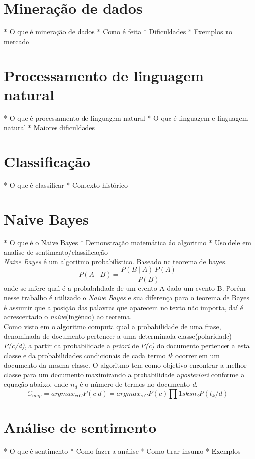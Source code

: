\section{Mineração de dados}\label{sec:mineracao_dados}
* O que é mineração de dados
* Como é feita
* Dificuldades
* Exemplos no mercado


\section{Processamento de linguagem natural}\label{sec:nlp}
* O que é processamento de linguagem natural
* O que é linguagem e linguagem natural
* Maiores dificuldades

\section{Classificação}\label{sec:classificacao}
* O que é classificar
* Contexto histórico




\section{Naive Bayes}\label{sec:naive_bayes}
* O que é o Naive Bayes
* Demonstração matemática do algoritmo
* Uso dele em analise de sentimento/classificação
\\ \emph{Naive Bayes} é um algoritmo probabilístico. Baseado no teorema de bayes. $$ P(A \mid B) = \frac{P(B \mid A) \, P(A)}{P(B)} $$ onde se infere qual é a probabilidade de um evento A dado um evento B. Porém nesse trabalho é utilizado o \emph{Naive Bayes} e sua diferença para o teorema de Bayes é assumir que a posição das palavras que aparecem no texto não importa, daí é acrescentado o \emph{naive}(ingênuo) ao teorema.
\\ Como visto em \cite{lucca2013implementaccao} o algoritmo computa qual a probabilidade de uma frase, denominada de documento pertencer a uma determinada classe(polaridade) \emph{P(c/d)}, a partir da probabilidade a \emph{priori} de \emph{P(c)} do documento pertencer a esta classe e da probabilidades condicionais de cada termo \emph{tk} ocorrer em um documento da mesma classe. O algoritmo tem como objetivo encontrar a melhor classe para um documento maximizando a probabilidade a\emph{posteriori} conforme a equação abaixo, onde $ n_{d} $ é o número de termos no documento \emph{d}. $$ C_{map}= argmax_{c \epsilon C}P(c|d)=argmax_{c \epsilon C}P(c)\prod 1sksn_{d}P(t_{k}/d) $$

\section{Análise de sentimento}\label{sec:analise_sentimento}
* O que é sentimento
* Como fazer a análise
* Como tirar insumo
* Exemplos 
